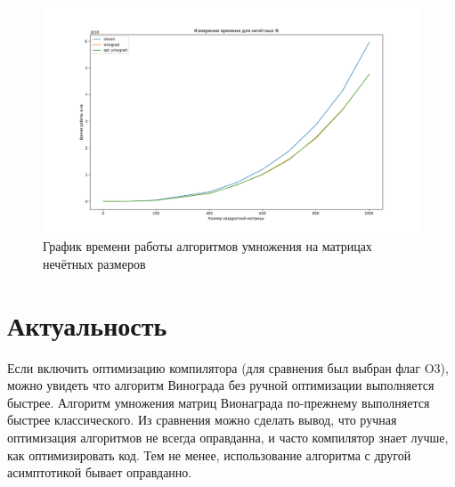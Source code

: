 \FloatBarrier
\begin{figure}[h!]
	\begin{center}
		\includegraphics[width=\linewidth]{inc/nechet.png}
	\end{center}
	\caption{График времени работы алгоритмов умножения на матрицах нечётных размеров}
\end{figure}
\FloatBarrier

\section{Актуальность}

Если включить оптимизацию компилятора (для сравнения был выбран флаг O3), можно увидеть что алгоритм Винограда без ручной оптимизации выполняется быстрее.
Алгоритм умножения матриц Вионаграда по-прежнему выполняется быстрее классического.
Из сравнения можно сделать вывод, что ручная оптимизация алгоритмов не всегда оправданна, и часто компилятор знает лучше, как оптимизировать код.
Тем не менее, использование алгоритма с другой асимптотикой бывает оправданно.

